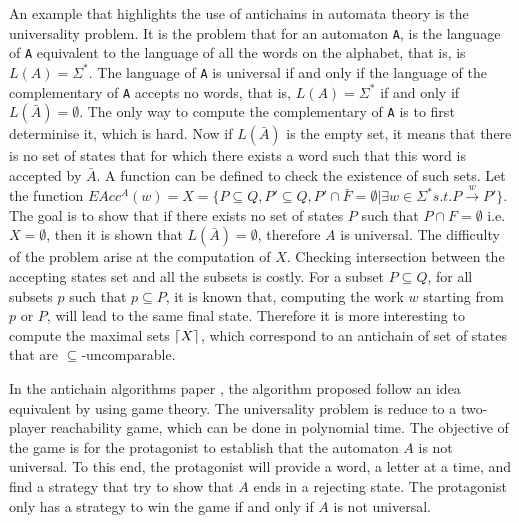 \documentclass[letterpaper]{article}
\DeclarePairedDelimiter{\ceil}{\lceil}{\rceil}
\theoremstyle{definition}
\begin{document}
An example that highlights the use of antichains in automata theory is
the universality problem. It is the problem that for an automaton
\texttt{A}, is the language of \texttt{A} equivalent to the language
of all the words on the alphabet, that is, is $L(A) = \Sigma^*$.
The language of \texttt{A} is universal if and only if the language
of the complementary of \texttt{A} accepts no words, that is,
$L(A) = \Sigma^*$ if and only if $L(\bar{A}) = \emptyset$.
The only way to compute the complementary of \texttt{A} is to first
determinise it, which is hard. Now if $L(\bar{A})$ is the empty set,
it means that there is no set of states that for which there exists a word
such that this word is accepted by $\bar{A}$. A function can be
defined to check the existence of such sets. Let the function
$EAcc^A(w) = X
= \{ P \subseteq Q, P' \subseteq Q, P' \cap \bar{F} = \emptyset
| \exists w \in \Sigma^* s.t. P \xrightarrow{w} P'\}$.
The goal is to show that if there exists
no set of states $P$ such that $P \cap F = \emptyset$ i.e.
$X = \emptyset$, then it is shown that $L(\bar{A}) = \emptyset$, therefore
$A$ is universal. The difficulty of the problem arise at the computation
of $X$. Checking intersection between the accepting states set and all
the subsets is costly.
For a subset $P \subseteq Q$, for all subsets $p$ such that $p \subseteq P$,
it is known that, computing the work $w$ starting from $p$ or $P$, will lead
to the same final state. Therefore it is more interesting to compute
the maximal sets $\ceil{X}$, which correspond to an antichain of set of
states that are $\subseteq$-uncomparable.

In the antichain algorithms paper
\cite{AC_universality}, the algorithm proposed follow an idea equivalent
by using game theory. The universality problem is reduce to
a two-player reachability game, which can be done in polynomial time.
The objective of the game is for the protagonist to establish that
the automaton $A$ is not universal. To this end, the protagonist will
provide a word, a letter at a time, and find a strategy that try
to show that $A$ ends in a rejecting state.
The protagonist only has a strategy to win the game if and only if $A$ is
not universal.

\end{document}
